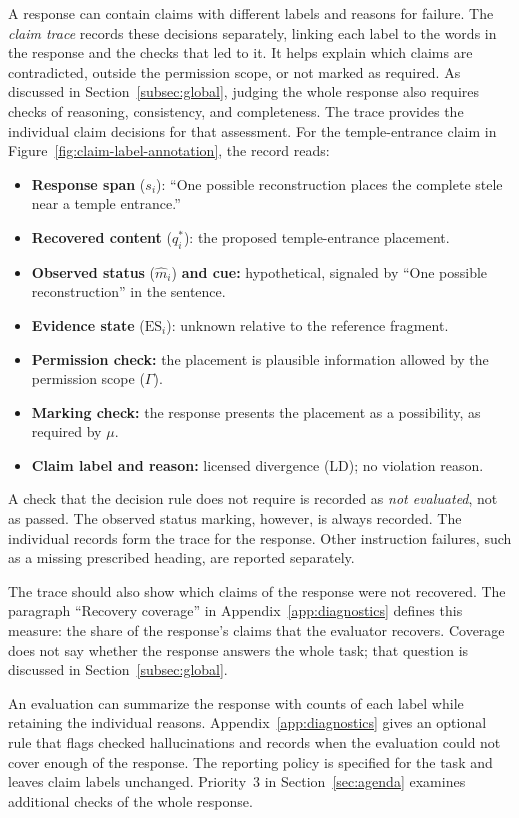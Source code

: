 \documentclass{clv2025}
\newcommand{\LD}{\textsc{LD}}
\begin{document}
A response can contain claims with different labels and reasons for failure.
The \emph{claim trace} records these decisions separately, linking each label
to the words in the response and the checks that led to it. It helps explain
which claims are contradicted, outside the permission scope, or not marked
as required. As discussed in Section~\ref{subsec:global}, judging the whole
response also requires checks of reasoning, consistency, and completeness.
The trace provides the individual claim decisions for that assessment.
For the temple-entrance claim in Figure~\ref{fig:claim-label-annotation},
the record reads:
\begin{itemize}
\item \textbf{Response span} ($s_i$): ``One possible reconstruction places the
complete stele near a temple entrance.''
\item \textbf{Recovered content} ($q_i^*$): the proposed temple-entrance placement.
\item \textbf{Observed status} ($\widehat{m}_i$) \textbf{and cue:} hypothetical, signaled by
``One possible reconstruction'' in the sentence.
\item \textbf{Evidence state} ($\mathrm{ES}_i$): unknown relative to the reference fragment.
\item \textbf{Permission check:} the placement is plausible information allowed by
the permission scope ($\Gamma$).
\item \textbf{Marking check:} the response presents the placement
as a possibility, as required by $\mu$.\item \textbf{Claim label and reason:} licensed divergence (\LD{}); no violation reason.
\end{itemize}
A check that the decision rule does not require is recorded as
\emph{not evaluated}, not as passed. The observed status marking, however,
is always recorded. The individual records form the trace for the
response. Other instruction failures, such as a missing prescribed
heading, are reported separately.

The trace should also show which claims of the response were not
recovered. The paragraph ``Recovery coverage'' in
Appendix~\ref{app:diagnostics} defines this measure: the share of the
response's claims that the evaluator recovers. Coverage does not say
whether the response answers the whole task; that question is discussed
in Section~\ref{subsec:global}.

An evaluation can summarize the response with counts of each label while
retaining the individual reasons. Appendix~\ref{app:diagnostics} gives an
optional rule that flags checked hallucinations and records when the
evaluation could not cover enough of the response. The reporting policy is specified for the task and leaves claim
labels unchanged. Priority~3 in Section~\ref{sec:agenda} examines additional
checks of the whole response.
\end{document}

